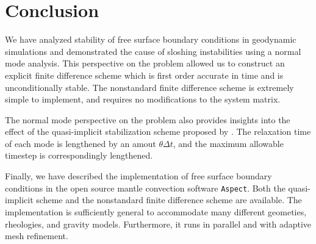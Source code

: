 \documentclass[preprint,12pt,authoryear]{elsarticle}
\begin{document}
\section{Conclusion}
We have analyzed stability of free surface boundary conditions in geodynamic simulations and 
demonstrated the cause of sloshing instabilities using a normal mode analysis.
This perspective on the problem allowed us to construct an explicit finite difference 
scheme which is first order accurate in time and is unconditionally stable.
The nonstandard finite difference scheme is extremely simple to implement, and 
requires no modifications to the system matrix.

The normal mode perspective on the problem also provides insights into the effect of 
the quasi-implicit stabilization scheme proposed by \citet{kaus2010stabilization}.
The relaxation time of each mode is lengthened by an amout $\theta \Delta t$, and the
maximum allowable timestep is correspondingly lengthened.

Finally, we have described the implementation of free surface boundary conditions in 
the open source mantle convection software \texttt{Aspect}. Both the quasi-implicit 
scheme and the nonstandard finite difference scheme are available. The implementation is 
sufficiently general to accommodate many different geometies, rheologies, and 
gravity models. Furthermore, it runs in parallel and with adaptive mesh refinement.



 






\end{document}
